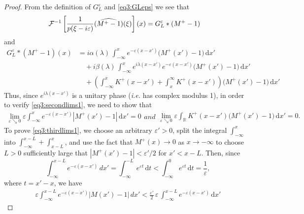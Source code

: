 \documentclass[../dissertation.tex]{subfiles}
\begin{document}
\begin{proof}
	From the definition of $G_L^\varepsilon$ and \eqref{eq3:GLeps} we see that
	\begin{align*}
		\mathcal F^{-1}
				\left[ 
					\frac{1}{p(\xi-i\varepsilon)} (\widehat{M^+-1})(\xi) 
				\right](x) 
			&= G_L^\varepsilon * (M^+-1)
	\end{align*}
	and
	\begin{align*}
		G_L^\varepsilon * (M^+-1)(x)
			&= i \alpha(\lambda) \, 
				\int_{-\infty}^x 
					e^{-\varepsilon(x - x')} \big(M^+(x')-1\big) 
				\, \mathrm{d}x' \\
			&\quad + i \beta(\lambda) \, 
					\int_{-\infty}^x 
						e^{i\lambda (x-x')} e^{-\varepsilon(x-x')}\big(M^+(x')-1\big) 
					\, \mathrm{d}x' \\
			&\quad + \left( 
						\int_{-\infty}^x K^+(x- x') + \int_{x}^\infty K^+(x - x') 
					\right)
					\big(M^+(x')-1\big) \, \mathrm{d}x'
	\end{align*}
	Thus, since $e^{i\lambda (x-x')}$ is a unitary phase (\textit{i.e.} has complex 
	modulus 1), in order to verify \eqref{eq3:secondlims1}, we need to show that
	\begin{subequations}
		\label{eq3:thirdlims}
		\begin{align}
			\label{eq3:thirdlims1}
			\lim_{\varepsilon\searrow 0} \varepsilon 
				\int_{-\infty}^x 
					e^{-\varepsilon(x-x')} |M^+(x') - 1| 
				\, \mathrm{d}x' = 0
		\end{align}
		and
		\begin{align}
			\label{eq3:thirdlims2}
			\lim_{\varepsilon\searrow 0} \varepsilon 
					\int_{\mathbb R} K^+(x- x') \big(M^+(x')-1\big) \, \mathrm{d}x'
				= 0.
		\end{align}
	\end{subequations}
	To prove \eqref{eq3:thirdlims1}, we choose an arbitrary $\varepsilon'>0$, 
	split the integral $\int_{-\infty}^x$ into $\int_{-\infty}^{x-L} + \int_{x-L}^x$, 
	and use the fact that $M^+(x) \to 0$ as $x \to -\infty$ to choose $L>0$ 
	suf{}ficiently large that $|M^+(x')  - 1| < \varepsilon'/2$ for $x' < x-L$. Then,
	since 
	\[
		\int_{-\infty}^{x-L} e^{-\varepsilon (x-x')} \,dx'
			= \int_{-\infty}^{-L} e^{\varepsilon t} \, \mathrm{d}t
			< \int_{-\infty}^0 e^{\varepsilon t} \, \mathrm{d}t 
			= \frac{1}{\varepsilon},
	\]
	where $t = x'-x$, we have
	\begin{align} \label{eq3:DEtoIEthirdlim1v1}
		\varepsilon \int_{-\infty}^{x-L} e^{-\varepsilon(x-x')} |M(x') - 1| \,dx'
			< \frac{\varepsilon'}{2} \, \varepsilon \, \int_{-\infty}^{x-L} e^{-\varepsilon(x-x')} \, \mathrm{d}x'

\end{align}
\end{proof}
\end{document}
